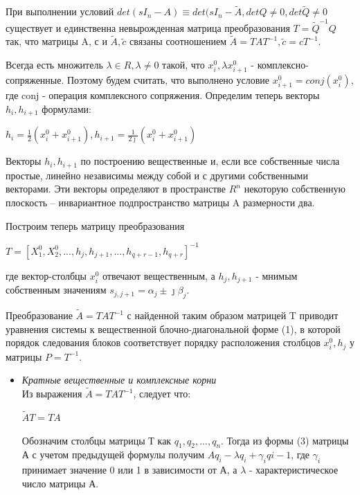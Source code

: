 \documentclass[14pt,a4paper,report]{report}
\begin{document}
\begin{itemize}
	При выполнении условий $det(sI_n-A)\equiv det(sI_n-\widetilde{A}, detQ\neq 0, det\widetilde{Q}\neq0$ существует и единственна невырожденная матрица преобразования $T=\widetilde{Q}^{-1}Q$ так, что матрицы A, с и $\widetilde{A}, \widetilde{c}$ связаны соотношением	$\widetilde{A}=TAT^{-1}, \widetilde{c}=cT^{-1}$.
	
	
	Всегда есть множитель $\lambda\in R, \lambda\neq0$ такой, что $x^0_i, \lambda x^0_{i+1}$ - комплексно-сопряженные. Поэтому будем считать, что выполнено условие $x^0_{i+1}=conj(x^0_i)$, где conj - операция комплексного сопряжения. Определим теперь векторы $h_i, h_{i+1}$ формулами:
	\begin{center}
		$h_i=\frac{1}{2}(x^0_i+x^0_{i+1}), h_{i+1}=\frac{1}{2\jmath}(x^0_i+x^0_{i+1})$
	\end{center}
	Векторы $h_i, h_{i+1}$ по построению вещественные и, если все собственные числа простые, линейно независимы между собой и с другими собственными векторами. Эти векторы определяют в пространстве $R^n$ некоторую собственную плоскость – инвариантное подпространство матрицы A размерности два.
	
	Построим теперь матрицу преобразования
	\begin{center}
		$T=[X^0_1, X^0_2, ..., h_j, h_{j+1}, ..., h_{q+r-1}, h_{q+r}]^{-1}$
	\end{center}
	где вектор-столбцы $x^0_i$ отвечают вещественным, а $h_j, h_{j+1}$ - мнимым собственным значениям $s_{j,j+1}=\alpha_j\pm\jmath\beta_j$.
	
	Преобразование $\widetilde{A}=TAT^{-1}$ с найденной таким образом матрицей T приводит уравнения системы к вещественной блочно-диагональной форме (1), в которой порядок следования блоков соответствует порядку расположения столбцов $x^0_i, h_j$ у матрицы $P=T^{-1}$.
	
	\begin{itemize}
		\item \emph{Кратные вещественные и комплексные корни}\\
		Из выражения $\widetilde{A}=TAT^{-1}$, следует что:
		\begin{center}
			$\widetilde{A}T=TA$
		\end{center}
		
		Обозначим столбцы матрицы Т как $q_1, q_2, ..., q_n$. Тогда из формы (3) матрицы А с учетом предыдущей формулы получим $Aq_i-\lambda q_i+\gamma_iq{i-1}$, где $\gamma_i$ принимает значение 0 или 1 в зависимости от А, а $\lambda$ - характеристическое число матрицы А.
		

\end{itemize}
\end{itemize}
\end{document}
